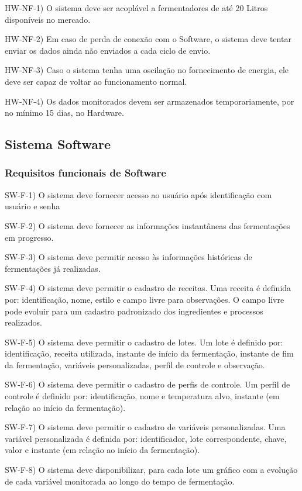 HW-NF-1) O sistema deve ser acoplável a fermentadores de até 20 Litros disponíveis no mercado.

HW-NF-2) Em caso de perda de conexão com o Software, o sistema deve tentar enviar os dados ainda não enviados a cada ciclo de envio.

HW-NF-3) Caso o sistema tenha uma oscilação no fornecimento de energia, ele deve ser capaz de voltar ao funcionamento normal.

HW-NF-4) Os dados monitorados devem ser armazenados temporariamente, por no mínimo 15 dias, no Hardware.

\subsection{Sistema Software}

\subsubsection{Requisitos funcionais de Software}

SW-F-1) O sistema deve fornecer acesso ao usuário após identificação com usuário e senha

SW-F-2) O sistema deve fornecer as informações instantâneas das fermentações em progresso.

SW-F-3) O sistema deve permitir acesso às informações históricas de fermentações já realizadas.

SW-F-4) O sistema deve permitir o cadastro de receitas. Uma receita é definida por: identificação, nome, estilo e campo livre para observações. O campo livre pode evoluir para um cadastro padronizado dos ingredientes e processos realizados.

SW-F-5) O sistema deve permitir o cadastro de lotes. Um lote é definido por: identificação, receita utilizada, instante de início da fermentação, instante de fim da fermentação, variáveis personalizadas, perfil de controle e observação.

SW-F-6) O sistema deve permitir o cadastro de perfis de controle. Um perfil de controle é definido por: identificação, nome e temperatura alvo, instante (em relação ao início da fermentação).

SW-F-7) O sistema deve permitir o cadastro de variáveis personalizadas. Uma variável personalizada é definida por: identificador, lote correspondente, chave, valor e instante (em relação ao início da fermentação).

SW-F-8) O sistema deve disponibilizar, para cada lote um gráfico com a evolução de cada variável monitorada ao longo do tempo de fermentação.

